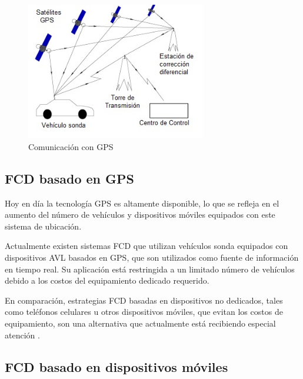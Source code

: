 \begin{figure}[h]
	\centering
	\includegraphics[width=0.7\textwidth]{capitulos/3/figuras/figura4.jpg}
	\caption{\label{fig:ComunicacionGPS}  Comunicación con GPS}	
\end{figure}

\subsection{FCD basado en GPS}


Hoy en día la tecnología GPS es altamente disponible, lo que se refleja en el aumento del número de vehículos y dispositivos móviles equipados con este sistema de ubicación.


Actualmente existen sistemas FCD que utilizan vehículos sonda equipados con dispositivos AVL basados en GPS, que son utilizados como fuente de información en tiempo real. Su aplicación está restringida a un limitado número de vehículos debido a los costos del equipamiento dedicado requerido. 

En comparación, estrategias FCD basadas en dispositivos no dedicados, tales como teléfonos celulares u otros dispositivos móviles, que evitan los costos de equipamiento, son una alternativa que actualmente está recibiendo especial atención \cite{thiagarajan2010cooperative,thiagarajan2009vtrack,de2008traffic}.

\subsection{FCD basado en dispositivos móviles}

